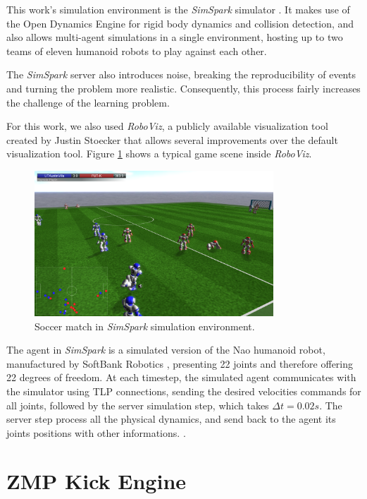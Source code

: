 This work's simulation environment is the \textit{SimSpark} simulator \cite{Simspark}. It makes use of the Open Dynamics Engine \cite{ODE} for rigid body dynamics and collision detection, and also allows multi-agent simulations in a single environment, hosting up to two teams of eleven humanoid robots to play against each other.

The \textit{SimSpark} server also introduces noise, breaking the reproducibility of events and turning the problem more realistic. Consequently, this process fairly increases the challenge of the learning problem.

For this work, we also used \textit{RoboViz}, a publicly available visualization tool created by Justin Stoecker \cite{RoboViz} that allows several improvements over the default visualization tool. Figure \ref{fig:roboviz_game} shows a typical game scene inside \textit{RoboViz}.

\begin{figure}[H]
    \centering
    \includegraphics[width=0.8\textwidth]{Chapter5/sim3d.png} 
    \caption{Soccer match in \textit{SimSpark} simulation environment.}
    \label{fig:roboviz_game}
\end{figure}

The agent in \textit{SimSpark} is a simulated version of the Nao humanoid robot, manufactured by SoftBank Robotics \cite{NaoRobot}, presenting 22 joints and therefore offering 22 degrees of freedom. At each timestep, the simulated agent communicates with the simulator using TLP connections, sending the desired velocities commands for all joints, followed by the server simulation step, which takes $\Delta t = 0.02s$. The server step process all the physical dynamics, and send back to the agent its joints positions with other informations. \cite{SimSparkEffectors}.

\section{ZMP Kick Engine}

